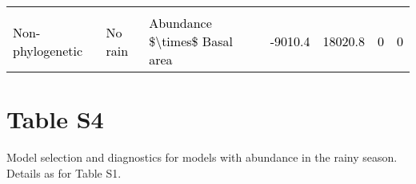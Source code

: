 \documentclass[
  12pt,
  letterpaper,
  DIV=11,
  numbers=noendperiod]{scrartcl}
\begin{document}
\begin{table}[H]
{\begin{tabular}[t]{lllllll}
\cellcolor{gray!6}{\textcolor{black}{Phylogenetic}} & \cellcolor{gray!6}{\textcolor{black}{No rain}} & \cellcolor{gray!6}{\textcolor{black}{Abundance + Basal area}} & \cellcolor{gray!6}{\textcolor{black}{-9010.0}} & \cellcolor{gray!6}{\textcolor{black}{18020.1}} & \cellcolor{gray!6}{\textcolor{black}{0}} & \cellcolor{gray!6}{\textcolor{black}{0}}\\
\textcolor{black}{Non-phylogenetic} & \textcolor{black}{No rain} & \textcolor{black}{Abundance \$\textbackslash{}times\$ Basal area} & \textcolor{black}{-9010.4} & \textcolor{black}{18020.8} & \textcolor{black}{0} & \textcolor{black}{0}\\
\bottomrule
\end{tabular}}
\end{table}

\newpage

\hypertarget{table-s4}{%
\section{Table S4}\label{table-s4}}

Model selection and diagnostics for models with abundance in the rainy
season. Details as for Table S1.
\end{document}
